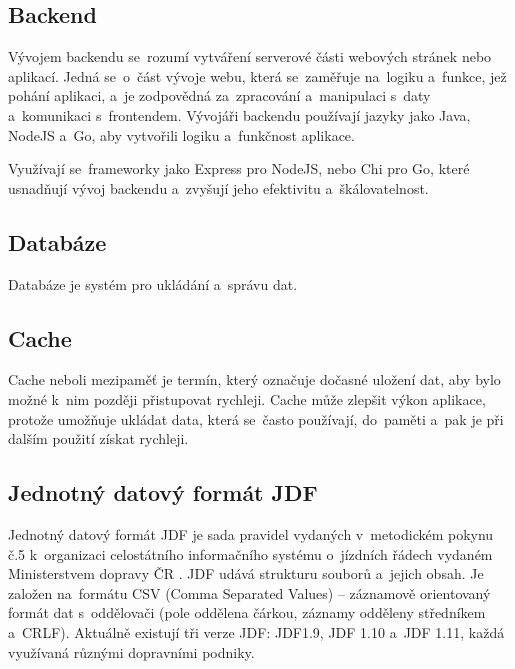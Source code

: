 \subsection{Backend} Vývojem backendu se~rozumí vytváření serverové části webových stránek nebo aplikací. Jedná se~o~část vývoje webu, která se~zaměřuje na~logiku a~funkce, jež pohání aplikaci, a~je zodpovědná za~zpracování a~manipulaci s~daty a~komunikaci s~frontendem. Vývojáři backendu používají jazyky jako Java, NodeJS a~Go, aby vytvořili logiku a~funkčnost aplikace. \par Využívají se~frameworky jako Express pro NodeJS, nebo Chi pro Go, které usnadňují vývoj backendu a~zvyšují jeho efektivitu a~škálovatelnost.
\subsection{Databáze} Databáze je systém pro ukládání a~správu dat.
\subsection{Cache}\label{cache} Cache neboli mezipaměť je termín, který označuje dočasné uložení dat, aby bylo možné k~nim později přistupovat rychleji. Cache může zlepšit výkon aplikace, protože umožňuje ukládat data, která se~často používají, do~paměti a~pak je při dalším použití získat rychleji. \par
\subsection[JDF]{Jednotný datový formát JDF}\label{JDF} Jednotný datový formát JDF je sada pravidel vydaných v~metodickém pokynu č.5 k~organizaci celostátního informačního systému o~jízdních řádech vydaném Ministerstvem dopravy ČR \cite{jdfpokyn}. JDF udává strukturu souborů a~jejich obsah. Je založen na~formátu CSV (Comma Separated Values) – záznamově orientovaný formát dat s~oddělovači (pole oddělena čárkou, záznamy odděleny středníkem a~CRLF). Aktuálně existují tři \newline verze JDF: JDF1.9, JDF 1.10 a~JDF 1.11, každá využívaná různými dopravními podniky. \par
